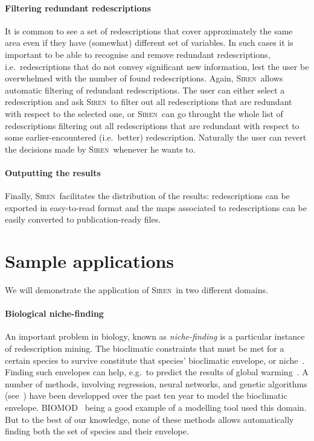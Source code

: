\documentclass{sig-alternate}
\newcommand{\prg}[1]{\paragraph{#1}}
\newcommand{\Siren}{\textsc{Siren}}
\begin{document}




\prg{Filtering redundant redescriptions}
\label{sec:filt-redund-redescr}
It is common to see a set of redescriptions that cover approximately
the same area even if they have (somewhat) different set of
variables. In such cases it is important to be able to recognise and
remove redundant redescriptions, i.e.\ redescriptions that do not
convey significant new information, lest the user be overwhelmed with
the number of found redescriptions. Again, \Siren\ allows automatic
filtering of redundant redescriptions. The user can either select a
redescription and ask \Siren\ to filter out all redescriptions that
are redundant with respect to the selected one, or \Siren\
can go throught the whole list of redescriptions filtering out all
redescriptions that are redundant with respect to some
earlier-encountered (i.e.\ better) redescription. Naturally the user
can revert the decisions made by \Siren\ whenever he wants to.



\prg{Outputting the results}
\label{sec:outputting-results}
Finally, \Siren\ facilitates the distribution of the results:
redescriptions can be exported in easy-to-read format and the
maps associated to redescriptions can be easily converted to
publication-ready files. 

\section{Sample applications}
We will demonstrate the application of \Siren\ in two different domains. 

\prg{Biological niche-finding}
An important problem in biology, known as \emph{niche-finding} is a
particular instance of redescription mining.  The bioclimatic
constraints that must be met for a certain species to survive
constitute that species' bioclimatic envelope, or niche~\cite{grinnell17niche}.  Finding such
envelopes can help, e.g.\ to predict the results of global
warming~\cite{pearson03predicting}.  A number of methods, involving
regression, neural networks, and genetic algorithms
(see~\cite{soberon05interpretation}) have been developped over the
past ten year to model the bioclimatic envelope.
\textsc{BIOMOD}~\cite{thuiller09biomod} being a good example of
a modelling tool used this domain.  But to the best of our
knowledge, none of these methods allows automatically finding both the
set of species and their envelope.
\end{document}
